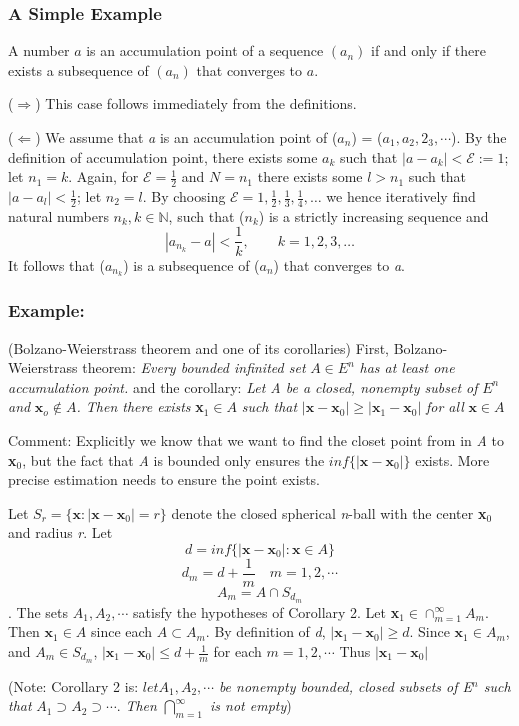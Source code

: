 \documentclass[titlepage,a4paper,12pt]{article}
\theoremstyle{nonumberplain}
\newtheorem{Proof}{\hskip 2em Proof}
\begin{document}
\subsubsection{A Simple Example}
A number $a$ is an accumulation point of a sequence $(a_n)$ if and only if there exists a subsequence of $(a_n)$ that converges to $a$.\par
\begin{Proof}
($\Rightarrow$) This case follows immediately from the definitions.\par
($\Leftarrow$) We assume that \emph{a} is an accumulation point of ($a_n$) = ($a_1,a_2,2_3,\dotsb$). By the definition of accumulation point, there exists some $a_k$ such that $|a-a_k|<\mathcal{E}:=1$; let $n_1=k$. Again, for $\mathcal{E}=\frac{1}{2}$ and $N=n_1$ there exists some $l>n_1$ such that $|a-a_l|<\frac{1}{2}$; let $n_2=l$. By choosing $\mathcal{E}=1,\frac{1}{2},\frac{1}{3},\frac{1}{4},\dotsc$ we hence iteratively find natural numbers $n_k,k\in \mathds{N}$, such that ($n_k$) is a strictly increasing sequence and
$$|a_{n_k}-a|<\frac{1}{k},\qquad k=1,2,3,\dotsc$$
It follows that ($a_{n_k}$) is a subsequence of ($a_n$) that converges to \emph{a}.
\end{Proof}

\subsubsection{Example:}(Bolzano-Weierstrass theorem and one of its corollaries) 
First, Bolzano-Weierstrass theorem: \emph{Every bounded infinited set} $A\in E^n$ \emph{has at least one accumulation point.} and the corollary: \emph{Let A be a closed, nonempty subset of } $E^n$ \emph{and} $\textbf{x}_o \not\in A$\emph{. Then there exists} \textbf{x}$_1\in A$ \emph{such that} $|\textbf{x}-\textbf{x}_0|\geq |\textbf{x}_1-\textbf{x}_0|$ \emph{for all} $\textbf{x} \in A$\par
Comment: Explicitly we know that we want to find the closet point from in \emph{A} to \textbf{x}$_0$, but the fact that \emph{A} is bounded only ensures the $inf\{|\textbf{x}-\textbf{x}_0|\}$ exists. More precise estimation needs to ensure the point exists.
\begin{Proof}
Let $S_r=\{\textbf{x}:|\textbf{x}-\textbf{x}_0|=r\}$ denote the closed spherical \emph{n}-ball with the center \textbf{x}$_0$ and radius \emph{r}. Let
$$d=inf\{|\textbf{x}-\textbf{x}_0|:\textbf{x}\in A\}$$
$$d_m=d+\frac{1}{m}\quad m=1,2,\dotsb$$
$$A_m=A\cap S_{d_m}$$.
The sets $A_1,A_2,\dotsb$ satisfy the hypotheses of Corollary 2. Let \textbf{x}$_1\in \cap_{m=1}^{\infty} A_m$. Then $\textbf{x}_1 \in A$ since each $A\subset A_m$. By definition of \emph{d}, $|\textbf{x}_1-\textbf{x}_0|\geq d$. Since $\textbf{x}_1 \in A_m$, and $A_m\in S_{d_m}$, $|\textbf{x}_1-\textbf{x}_0|\leq d+\frac{1}{m}$ for each $m=1,2,\dotsb$ Thus $|\textbf{x}_1-\textbf{x}_0|$
\end{Proof}
(Note: Corollary 2 is: $let   A_1,A_2,\dotsb$ 
\emph{be nonempty bounded, closed subsets of E$^n$ such that} 
$A_1\supset A_2\supset \dotsb$. \emph{Then} $\bigcap_{m=1}^{\infty}$ \emph{is not empty})
\end{document}
